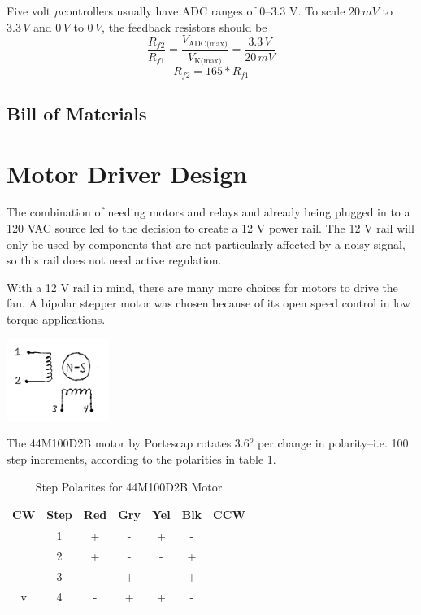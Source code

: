\documentclass[10pt, twocolumn]{article}
\begin{document}
Five volt $\mu$controllers usually have ADC ranges of 0--3.3 V.
To scale $20\,mV$ to $3.3\,V$ and $0\,V$ to $0\,V$, the feedback resistors
should be
\begin{equation*}
	\frac{R_{f2}}{R_{f1}}=
	\frac{V_{\textrm{ADC(max)}}}{V_{\textrm{K(max)}}}=
	\frac{3.3\,V}{20\,mV}
\end{equation*}
\begin{equation}
R_{f2}=165*R_{f1}
\end{equation}

\subsection{Bill of Materials}

\section{Motor Driver Design}

The combination of needing motors and relays and already being plugged in to a 
120 VAC source led to the decision to create a 12 V power rail. The 12 V rail
will only be used by components that are not particularly affected by a noisy
signal, so this rail does not need active regulation.

With a 12 V rail in mind, there are many more choices for motors to drive the fan.
A bipolar stepper motor was chosen because of its open speed control in low torque applications.

\begin{center}
	\includegraphics[width=0.25\textwidth]{Figures/bipolar-motor.pdf}
\end{center}

The 44M100D2B motor by Portescap rotates $3.6^{o}$ per change in polarity--i.e. 100 step increments,
according to the polarities in
\hyperref[44M100D2B-polarities]{table \ref{44M100D2B-polarities}}.

\begin{table}
\centering
\caption{Step Polarites for 44M100D2B Motor}
\begin{tabular}{c | c | c | c | c | c | c}
\hline\hline
CW	&Step	&Red	&Gry	&Yel	&Blk	&CCW	\\
\hline\hline
\verb1|1	&1	&+	&-	&+	&-	&\verb1^1	\\
\verb1|1	&2	&+	&-	&-	&+	&\verb1|1	\\
\verb1|1	&3	&-	&+	&-	&+	&\verb1|1	\\
v	&4	&-	&+	&+	&-	&\verb1|1	\\
\hline\hline
\end{tabular}
\label{44M100D2B-polarities}
\end{table}
\end{document}
